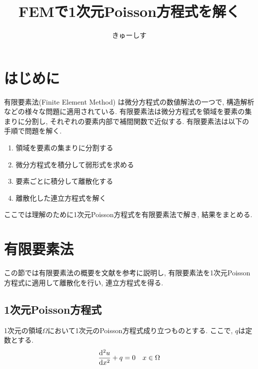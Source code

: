 \documentclass[paper=a4]{jlreq}
\begin{document}
\title{FEMで1次元Poisson方程式を解く}
\author{きゅーしす}
\maketitle

\section{はじめに}

有限要素法(Finite Element Method)
は微分方程式の数値解法の一つで, 構造解析などの様々な問題に適用されている.
有限要素法は微分方程式を領域を要素の集まりに分割し, 
それぞれの要素内部で補間関数で近似する.
有限要素法は以下の手順で問題を解く.
\begin{enumerate}
    \item 領域を要素の集まりに分割する
    \item 微分方程式を積分して弱形式を求める
    \item 要素ごとに積分して離散化する
    \item 離散化した連立方程式を解く
\end{enumerate}

ここでは理解のために1次元Poisson方程式を有限要素法で解き, 結果をまとめる.

\section{有限要素法}
この節では有限要素法の概要を文献\cite{nakajima}を参考に説明し, 
有限要素法を1次元Poisson方程式に適用して離散化を行い, 連立方程式を得る.

\subsection{1次元Poisson方程式}
1次元の領域$\Omega$において1次元のPoisson方程式成り立つものとする. 
ここで, $q$は定数とする.
\begin{align}
    \dv[2]{u}{x} + q = 0 \quad x \in \Omega \label{eq:poisson}
\end{align}
\end{document}
